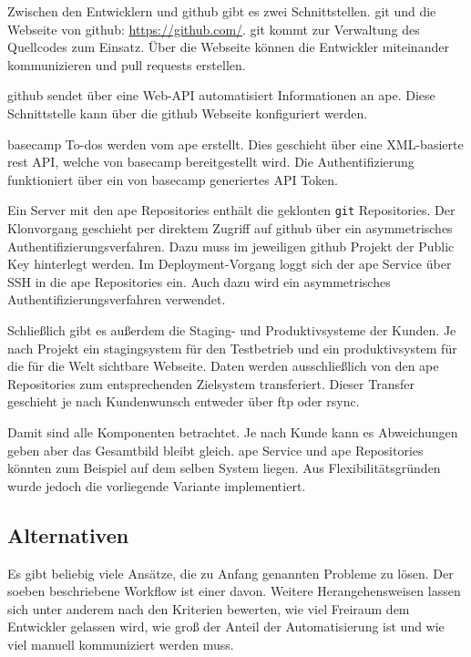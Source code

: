 Zwischen den Entwicklern und \gls{github} gibt es zwei Schnittstellen. \gls{git} und die Webseite von \gls{github}: \url{https://github.com/}. \gls{git} kommt zur Verwaltung des Quellcodes zum Einsatz. Über die Webseite können die Entwickler miteinander kommunizieren und \glspl{pull request} erstellen.

\gls{github} sendet über eine Web-API automatisiert Informationen an \gls{ape}. Diese Schnittstelle kann über die \gls{github} Webseite konfiguriert werden.

\gls{basecamp} To-dos werden vom \gls{ape} erstellt. Dies geschieht über eine XML-basierte \gls{rest} API, welche von \gls{basecamp} bereitgestellt wird. Die Authentifizierung funktioniert über ein von \gls{basecamp} generiertes API Token.

Ein Server mit den \gls{ape} Repositories enthält die geklonten \lstinline!git! Repositories. Der Klonvorgang geschieht per direktem Zugriff auf \gls{github} über ein asymmetrisches Authentifizierungsverfahren. Dazu muss im jeweiligen \gls{github} Projekt der Public Key hinterlegt werden. Im Deployment-Vorgang loggt sich der \gls{ape} Service über SSH in die \gls{ape} Repositories ein. Auch dazu wird ein asymmetrisches Authentifizierungsverfahren verwendet.

Schließlich gibt es außerdem die Staging- und Produktivsysteme der Kunden. Je nach Projekt ein \gls{stagingsystem} für den Testbetrieb und ein \gls{produktivsystem} für die für die Welt sichtbare Webseite. Daten werden ausschließlich von den \gls{ape} Repositories zum entsprechenden Zielsystem transferiert. Dieser Transfer geschieht je nach Kundenwunsch entweder über \gls{ftp} oder \gls{rsync}.

Damit sind alle Komponenten betrachtet. Je nach Kunde kann es Abweichungen geben aber das Gesamtbild bleibt gleich. \gls{ape} Service und \gls{ape} Repositories könnten zum Beispiel auf dem selben System liegen. Aus Flexibilitätsgründen wurde jedoch die vorliegende Variante implementiert.


\subsection{Alternativen} %
\label{sub:alternativen}

Es gibt beliebig viele Ansätze, die zu Anfang genannten Probleme zu lösen. Der soeben beschriebene Workflow ist einer davon. Weitere Herangehensweisen lassen sich unter anderem nach den Kriterien bewerten, wie viel Freiraum dem Entwickler gelassen wird, wie groß der Anteil der Automatisierung ist und wie viel manuell kommuniziert werden muss.


